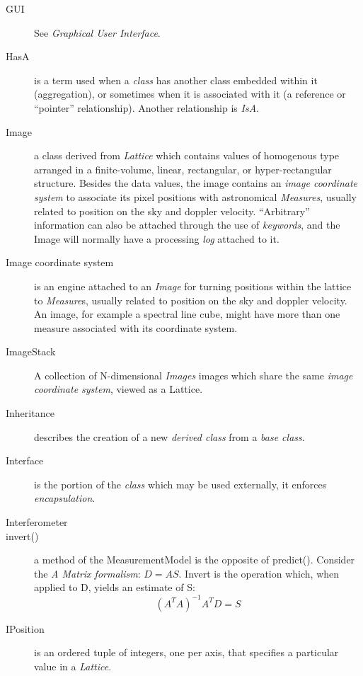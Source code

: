 \begin{description}
\item[GUI] See {\em Graphical User Interface}.


\item[HasA] is a term used when a {\em class} has another class
embedded within it (aggregation), or sometimes when it is associated
with it (a reference or ``pointer'' relationship). Another
relationship is {\em IsA}.


\item[Image] a class derived from {\em Lattice} which contains values
of homogenous type arranged in a finite-volume, linear, rectangular,
or hyper-rectangular structure. Besides the data values, the image
contains an {\em image coordinate system} to associate its pixel
positions with astronomical {\em Measures}, usually related to
position on the sky and doppler velocity. ``Arbitrary'' information
can also be attached through the use of {\em keywords}, and the Image
will normally have a processing {\em log} attached to it.


\item[Image coordinate system] 
is an engine attached to an {\em Image} for turning positions within
the lattice to {\em Measure}s, usually related to position on the sky
and doppler velocity. An image, for example a spectral line cube,
might have more than one measure associated with its coordinate system.


\item[ImageStack]
A collection of N-dimensional {\em Images} images which share the same
{\em image coordinate system}, viewed as a Lattice.


\item[Inheritance] describes the creation of a new {\em derived class}
from a {\em base class}.


\item[Interface] is the portion of the {\em class} which may be used
externally, it enforces {\em encapsulation}.


\item[Interferometer]


\item[invert()] a method of the MeasurementModel is the opposite of predict().
Consider the {\em A Matrix formalism}: $D = A S$.  Invert is the operation
which, when applied to D, yields an estimate of S:
$$ (A^{T} A)^{-1} A^{T} D = S $$

\item[IPosition]
is an ordered tuple of integers, one per axis, that specifies a
particular value in a {\em Lattice}.


\end{description}
